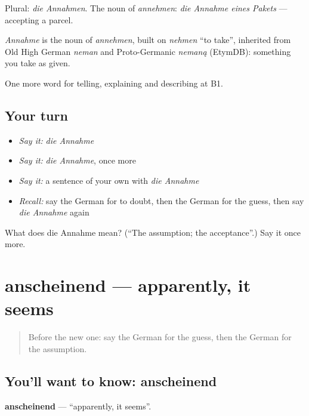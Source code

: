 Plural: \emph{die Annahmen}. The noun of \emph{annehmen}: \emph{die Annahme eines Pakets} — accepting a parcel.

\begin{cousinweb}
\emph{Annahme} is the noun of \emph{annehmen}, built on \emph{nehmen} \textquotedblleft{}to take\textquotedblright{}, inherited from Old High German \emph{neman} and Proto-Germanic \emph{nemaną} (EtymDB): something you take as given.
\end{cousinweb}

\begin{grammarlens}[title={What you've built}]
One more word for telling, explaining and describing at B1.
\end{grammarlens}

\subsection*{Your turn}
\begin{itemize}
\raggedright
  \item \emph{Say it:} \emph{die Annahme}
  \item \emph{Say it:} \emph{die Annahme}, once more
  \item \emph{Say it:} a sentence of your own with \emph{die Annahme}
  \item \emph{Recall:} say the German for to doubt, then the German for the guess, then say \emph{die Annahme} again
\end{itemize}

\begin{tcolorbox}[breakable,colback=teal!4,colframe=teal!35!black,title={Before you move on}]
What does die Annahme mean? (\textquotedblleft{}The assumption; the acceptance\textquotedblright{}.) Say it once more.
\end{tcolorbox}
\section[anscheinend]{anscheinend — apparently, it seems}

\label{lesson:GE-C338-anscheinend}



\begin{quote}
Before the new one: say the German for the guess, then the German for the assumption.
\end{quote}

\subsection*{You'll want to know: anscheinend}
\textbf{anscheinend} — \textquotedblleft{}apparently, it seems\textquotedblright{}.

